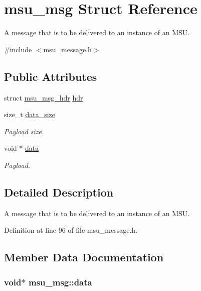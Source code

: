 \hypertarget{structmsu__msg}{\section{msu\-\_\-msg Struct Reference}
\label{structmsu__msg}
}


A message that is to be delivered to an instance of an M\-S\-U.  




{\ttfamily \#include $<$msu\-\_\-message.\-h$>$}

\subsection*{Public Attributes}
\begin{DoxyCompactItemize}
\item 
struct \hyperlink{structmsu__msg__hdr}{msu\-\_\-msg\-\_\-hdr} \hyperlink{structmsu__msg_a3c0177321a542571240821c2350ba424}{hdr}
\item 
size\-\_\-t \hyperlink{structmsu__msg_ad6dbac0bebca6dacb6cc2b1157d114ba}{data\-\_\-size}
\begin{DoxyCompactList}\small\item\em Payload size. \end{DoxyCompactList}\item 
void $\ast$ \hyperlink{structmsu__msg_acf7674882a092f71624a1e70202fb8c2}{data}
\begin{DoxyCompactList}\small\item\em Payload. \end{DoxyCompactList}\end{DoxyCompactItemize}


\subsection{Detailed Description}
A message that is to be delivered to an instance of an M\-S\-U. 

Definition at line 96 of file msu\-\_\-message.\-h.



\subsection{Member Data Documentation}
\hypertarget{structmsu__msg_acf7674882a092f71624a1e70202fb8c2}{
\subsubsection[{data}]{\setlength{\rightskip}{0pt plus 5cm}void$\ast$ msu\-\_\-msg\-::data}}\label{structmsu__msg_acf7674882a092f71624a1e70202fb8c2}


